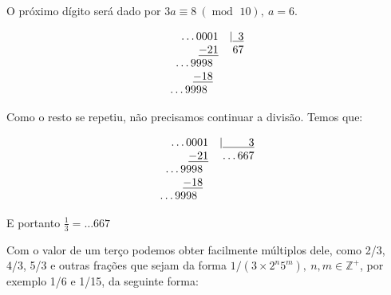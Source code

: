 \documentclass{report}
\DeclareMathOperator{\modulo}{mod \ }
\theoremstyle{definition}
\begin{document}
O próximo dígito será dado por $3a \equiv 8 \ (\modulo 10),\ a=6$.

\[
    \begin{array}{rr}
        \ldots 0001& |\underline{\hphantom{6}3}\\
                \underline{-21}&             67\\
        \ldots 9998\hphantom{1}& \\
                \underline{-18}\hphantom{1}& \\
        \ldots 9998\hphantom{81}&
    \end{array}
\]

Como o resto se repetiu, não precisamos continuar a divisão. Temos que:

\[
    \begin{array}{rr}
        \ldots 0001& |\underline{\hphantom{\ldots 66}3}\\
                \underline{-21}&             \ldots 667\\
        \ldots 9998\hphantom{1}& \\
        \underline{-18}\hphantom{1}& \\
        \ldots 9998\hphantom{81}&
    \end{array}
\]

E portanto $\frac{1}{3} = \ldots 667$

\bigskip

Com o valor de um terço podemos obter facilmente múltiplos dele, como 2/3, 4/3, 5/3 e outras frações que sejam da forma $1/(3\times 2^n 5^m), \ n,m \in \mathbb{Z}^+$, por exemplo 1/6 e 1/15, da seguinte forma:

\bigskip
\end{document}
